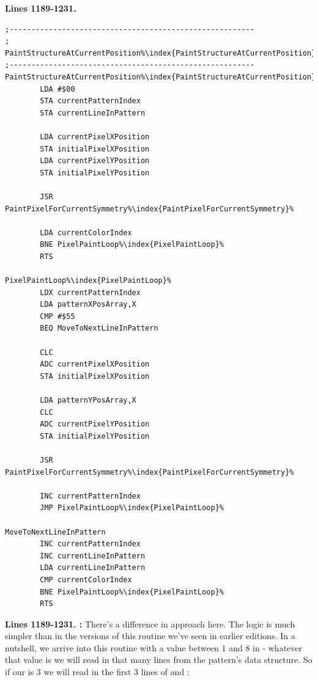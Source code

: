 \clearpage
\textbf{Lines 1189-1231. } 
\begin{lstlisting}[caption = All the pattern data structures in Psychedelia organized into a set of arrays.,escapechar=\%]
;--------------------------------------------------------
; PaintStructureAtCurrentPosition%\index{PaintStructureAtCurrentPosition}%
;--------------------------------------------------------
PaintStructureAtCurrentPosition%\index{PaintStructureAtCurrentPosition}%   
        LDA #$00
        STA currentPatternIndex
        STA currentLineInPattern

        LDA currentPixelXPosition
        STA initialPixelXPosition
        LDA currentPixelYPosition
        STA initialPixelYPosition

        JSR PaintPixelForCurrentSymmetry%\index{PaintPixelForCurrentSymmetry}%

        LDA currentColorIndex
        BNE PixelPaintLoop%\index{PixelPaintLoop}%
        RTS 

PixelPaintLoop%\index{PixelPaintLoop}%   
        LDX currentPatternIndex
        LDA patternXPosArray,X
        CMP #$55
        BEQ MoveToNextLineInPattern

        CLC 
        ADC currentPixelXPosition
        STA initialPixelXPosition

        LDA patternYPosArray,X
        CLC 
        ADC currentPixelYPosition
        STA initialPixelYPosition

        JSR PaintPixelForCurrentSymmetry%\index{PaintPixelForCurrentSymmetry}%

        INC currentPatternIndex
        JMP PixelPaintLoop%\index{PixelPaintLoop}%

MoveToNextLineInPattern   
        INC currentPatternIndex
        INC currentLineInPattern
        LDA currentLineInPattern
        CMP currentColorIndex
        BNE PixelPaintLoop%\index{PixelPaintLoop}%
        RTS 
\end{lstlisting}
\clearpage

\textbf{Lines 1189-1231. :} There's a difference in approach here.
The logic is much simpler than in the versions of this routine we've seen in earlier editions. In a nutshell, we
arrive into this routine with a value between 1 and 8 in  - whatever that value is we will
read in that many lines from the pattern's data structure.  So if our  is 3 we will
read in the first 3 lines of  and :

